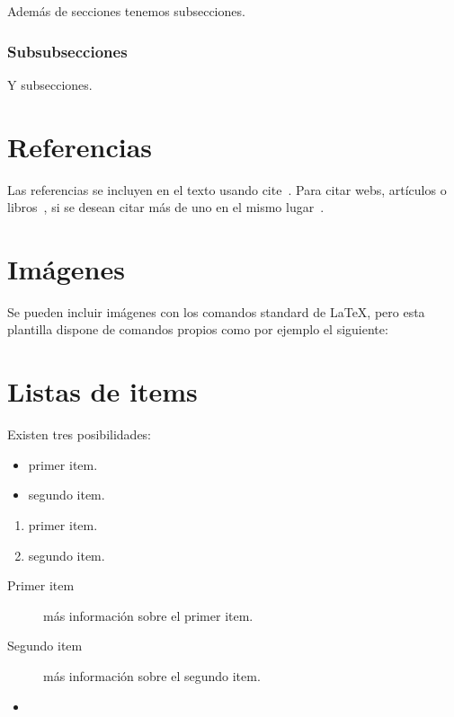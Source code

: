 Además de secciones tenemos subsecciones.

\subsubsection{Subsubsecciones}

Y subsecciones. 


\section{Referencias}

Las referencias se incluyen en el texto usando cite~\cite{wiki:latex}. Para citar webs, artículos o libros~\cite{koza92}, si se desean citar más de uno en el mismo lugar~\cite{bortolot2005, koza92}.


\section{Imágenes}

Se pueden incluir imágenes con los comandos standard de \LaTeX, pero esta plantilla dispone de comandos propios como por ejemplo el siguiente:




\section{Listas de items}

Existen tres posibilidades:

\begin{itemize}
	\item primer item.
	\item segundo item.
\end{itemize}

\begin{enumerate}
	\item primer item.
	\item segundo item.
\end{enumerate}

\begin{description}
	\item[Primer item] más información sobre el primer item.
	\item[Segundo item] más información sobre el segundo item.
\end{description}
	
\begin{itemize}
\item 
\end{itemize}

